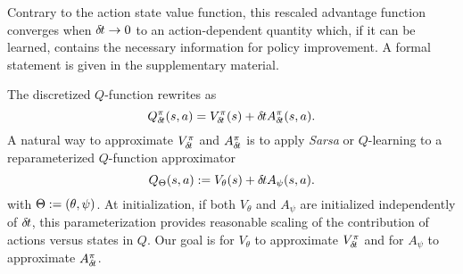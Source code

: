 Contrary to the action state value function,
this
rescaled advantage function converges when ${\delta\hspace{-.1em}t}\to 0$
to an action-dependent quantity which, if it can be learned, contains the
necessary information for policy improvement. A formal statement is given in the supplementary material.




The discretized $Q$-function rewrites as
\begin{equation}
	Q^\pi_{\delta\hspace{-.1em}t}(s, a) = V^\pi_{\delta\hspace{-.1em}t}(s) + {\delta\hspace{-.1em}t} A^\pi_{\delta\hspace{-.1em}t}(s, a).
	\label{eq:reparam_q_pi}
\end{equation}
A natural way to approximate $V^\pi_{\delta\hspace{-.1em}t}$ and $A^\pi_{\delta\hspace{-.1em}t}$ is to apply
\emph{Sarsa} or $Q$-learning to a reparameterized $Q$-function approximator
\begin{equation}
	Q_\Theta(s, a) \mathrel{\mathop{:}}= V_{\theta}(s) + {\delta\hspace{-.1em}t} A_{\psi}(s, a).
\end{equation}
with $\Theta \mathrel{\mathop{:}}= (\theta, \psi)$. At initialization, if both $V_{\theta}$ and
$A_{\psi}$ are initialized independently of ${\delta\hspace{-.1em}t}$, this parameterization
provides reasonable scaling of the contribution of actions versus states
in $Q$.
Our goal is for $V_\theta$ to approximate $V^\pi_{\delta\hspace{-.1em}t}$ and for
$A_{\psi}$ to approximate $A^\pi_{\delta\hspace{-.1em}t}$.


